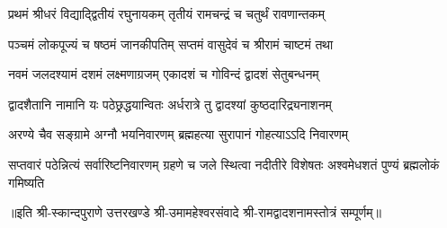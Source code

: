 

\twolineshloka
{प्रथमं श्रीधरं विद्याद्द्वितीयं रघुनायकम्}
{तृतीयं रामचन्द्रं च चतुर्थं रावणान्तकम्}

\twolineshloka
{पञ्चमं लोकपूज्यं च षष्ठमं जानकीपतिम्}
{सप्तमं वासुदेवं च श्रीरामं चाष्टमं तथा}

\twolineshloka
{नवमं जलदश्यामं दशमं लक्ष्मणाग्रजम्}
{एकादशं च गोविन्दं द्वादशं सेतुबन्धनम्}

\twolineshloka
{द्वादशैतानि नामानि यः पठेछ्रद्धयान्वितः}
{अर्धरात्रे तु द्वादश्यां कुष्ठदारिद्र्यनाशनम्}

\twolineshloka
{अरण्ये चैव सङ्ग्रामे अग्नौ भयनिवारणम्}
{ब्रह्महत्या सुरापानं गोहत्याऽऽदि निवारणम्}

\threelineshloka
{सप्तवारं पठेन्नित्यं सर्वारिष्टनिवारणम्}
{ग्रहणे च जले स्थित्वा नदीतीरे विशेषतः}
{अश्वमेधशतं पुण्यं ब्रह्मलोकं गमिष्यति}

॥इति श्री-स्कान्दपुराणे उत्तरखण्डे श्री-उमामहेश्वरसंवादे श्री-रामद्वादशनामस्तोत्रं सम्पूर्णम्॥